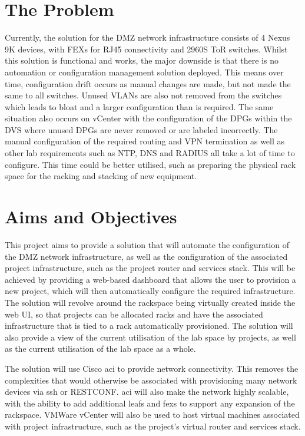 \section{The Problem}
\label{intro:problem}

Currently, the solution for the DMZ network infrastructure consists of 4 Nexus
9K devices, with FEXs for RJ45 connectivity and 2960S ToR switches. Whilst this
solution is functional and works, the major downside is that there is no
automation or configuration management solution deployed. This means over time,
configuration drift occurs as manual changes are made, but not made the same to
all switches. Unused VLANs are also not removed from the switches which leads
to bloat and a larger configuration than is required. The same situation also
occurs on vCenter with the configuration of the DPGs within the DVS where
unused DPGs are never removed or are labeled incorrectly.\newline
The manual configuration of the required routing and VPN termination as well as
other lab requirements such as NTP, DNS and RADIUS all take a lot of time to
configure. This time could be better utilised, such as preparing the physical
rack space for the racking and stacking of new equipment.

\section{Aims and Objectives}
\label{intro:aims}

This project aims to provide a solution that will automate the
configuration of the DMZ network infrastructure, as well as the configuration of the associated project infrastructure, such as the project router and services stack. This will be achieved by providing a web-based dashboard that allows the user to provision a new project, which will then automatically configure the required infrastructure. The solution will revolve around the rackspace being virtually created inside the web UI, so that projects can be allocated racks and have the associated infrastructure that is tied to a rack automatically provisioned. The solution will also provide a view of the current utilisation of the lab space by projects, as well as the current utilisation of the lab space as a whole.

The solution will use Cisco \gls{aci} to provide network connectivity. This removes the complexities that would otherwise be associated with provisioning many network devices via \gls{ssh} or RESTCONF. \gls{aci} will also make the network highly scalable, with the ability to add additional leafs and \gls{fex}s to support any expansion of the rackspace. VMWare vCenter will also be used to host virtual machines associated with project infrastructure, such as the project's virtual router and services stack.

